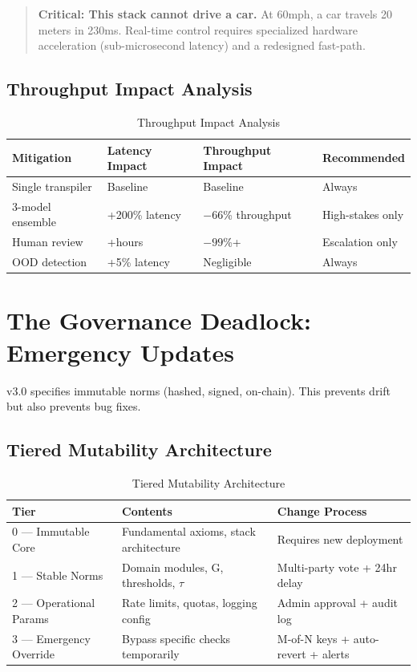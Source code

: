 \documentclass[11pt,letterpaper]{article}
\theoremstyle{definition}
\theoremstyle{remark}
\begin{document}
\begin{quote}
\textbf{Critical: This stack cannot drive a car.} At 60mph, a car travels 20 meters in 230ms. Real-time control requires specialized hardware acceleration (sub-microsecond latency) and a redesigned fast-path.
\end{quote}

\subsection{Throughput Impact Analysis}

\begin{table}[h]
\centering
\begin{tabular}{@{}llll@{}}
\toprule
\textbf{Mitigation} & \textbf{Latency Impact} & \textbf{Throughput Impact} & \textbf{Recommended} \\
\midrule
Single transpiler & Baseline & Baseline & Always \\
3-model ensemble & +200\% latency & $-66$\% throughput & High-stakes only \\
Human review & +hours & $-99$\%+ & Escalation only \\
OOD detection & +5\% latency & Negligible & Always \\
\bottomrule
\end{tabular}
\caption{Throughput Impact Analysis}
\end{table}


\section{The Governance Deadlock: Emergency Updates}

v3.0 specifies immutable norms (hashed, signed, on-chain). This prevents drift but also prevents bug fixes.

\subsection{Tiered Mutability Architecture}

\begin{table}[h]
\centering
\begin{tabular}{@{}lll@{}}
\toprule
\textbf{Tier} & \textbf{Contents} & \textbf{Change Process} \\
\midrule
0 --- Immutable Core & Fundamental axioms, stack architecture & Requires new deployment \\
1 --- Stable Norms & Domain modules, G, thresholds, $\tau$ & Multi-party vote + 24hr delay \\
2 --- Operational Params & Rate limits, quotas, logging config & Admin approval + audit log \\
3 --- Emergency Override & Bypass specific checks temporarily & M-of-N keys + auto-revert + alerts \\
\bottomrule
\end{tabular}
\caption{Tiered Mutability Architecture}
\end{table}
\end{document}
